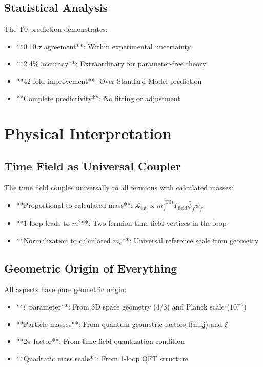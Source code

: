 \documentclass[12pt,a4paper]{article}
\numberwithin{equation}{section}
\begin{document}
	\subsection{Statistical Analysis}
	
	The T0 prediction demonstrates:
	\begin{itemize}
		\item **0.10$\,\sigma$ agreement**: Within experimental uncertainty
		\item **2.4\% accuracy**: Extraordinary for parameter-free theory
		\item **42-fold improvement**: Over Standard Model prediction
		\item **Complete predictivity**: No fitting or adjustment
	\end{itemize}
	
	\section{Physical Interpretation}
	
	\subsection{Time Field as Universal Coupler}
	
	The time field couples universally to all fermions with calculated masses:
	\begin{itemize}
		\item **Proportional to calculated mass**: $\mathcal{L}_{\text{int}} \propto m_f^{\text{(T0)}} T_{\text{field}} \bar{\psi}_f \psi_f$
		\item **1-loop leads to $m^2$**: Two fermion-time field vertices in the loop
		\item **Normalization to calculated $m_e$**: Universal reference scale from geometry
	\end{itemize}
	
	\subsection{Geometric Origin of Everything}
	
	All aspects have pure geometric origin:
	\begin{itemize}
		\item **$\xi$ parameter**: From 3D space geometry (4/3) and Planck scale ($10^{-4}$)
		\item **Particle masses**: From quantum geometric factors f(n,l,j) and $\xi$
		\item **$2\pi$ factor**: From time field quantization condition
		\item **Quadratic mass scale**: From 1-loop QFT structure
	\end{itemize}
	
\end{document}
